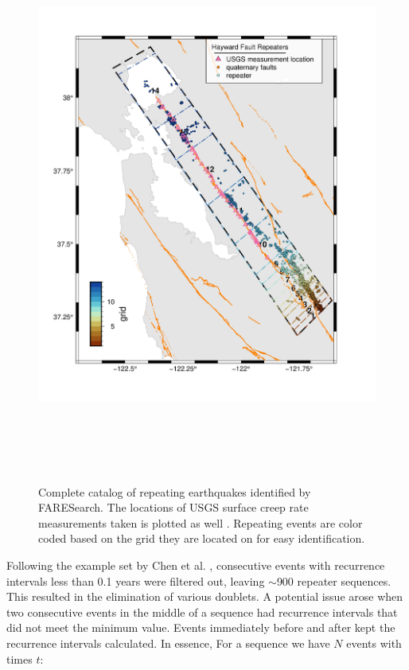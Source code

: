 \documentclass{article}
\begin{document}
\begin{figure}
\centering
\includegraphics[height=7.25in]{creep_locs.jpg}
\caption{\label{fig:creep_locs}Complete catalog of repeating earthquakes identified by FARESearch. The locations of USGS surface creep rate measurements taken is plotted as well \cite{johnson22}. Repeating events are color coded based on the grid they are located on for easy identification.}
\end{figure}

Following the example set by Chen et al. \cite{chen08}, consecutive events with recurrence intervals less than 0.1 years were filtered out, leaving $\sim$900 repeater sequences. This resulted in the elimination of various doublets. A potential issue arose when two consecutive events in the middle of a sequence had recurrence intervals that did not meet the minimum value. Events immediately before and after kept the recurrence intervals calculated. In essence,
\newline
\newline
For a sequence we have $N$ events with times $t$:
\begin{equation}
[t_1, t_2, t_3, t_4, ... t_N]
\label{eq:time_evs}
\end{equation}
\end{document}
